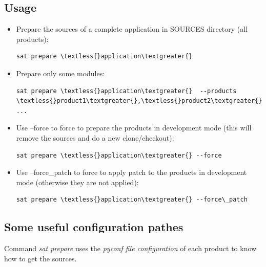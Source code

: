 \documentclass[a4paper,10pt,english]{sphinxmanual}
\begin{document}
\subsection{Usage}
\label{commands/prepare:usage}\begin{itemize}
\item {} 
Prepare the sources of a complete application in SOURCES directory (all products):

\begin{Verbatim}[commandchars=\\\{\}]
sat prepare \textless{}application\textgreater{}
\end{Verbatim}

\item {} 
Prepare only some modules:

\begin{Verbatim}[commandchars=\\\{\}]
sat prepare \textless{}application\textgreater{}  --products \textless{}product1\textgreater{},\textless{}product2\textgreater{} ...
\end{Verbatim}

\item {} 
Use --force to force to prepare the products in development mode
(this will remove the sources and do a new clone/checkout):

\begin{Verbatim}[commandchars=\\\{\}]
sat prepare \textless{}application\textgreater{} --force
\end{Verbatim}

\item {} 
Use --force\_patch to force to apply patch to the products
in development mode (otherwise they are not applied):

\begin{Verbatim}[commandchars=\\\{\}]
sat prepare \textless{}application\textgreater{} --force\_patch
\end{Verbatim}

\end{itemize}


\subsection{Some useful configuration pathes}
\label{commands/prepare:some-useful-configuration-pathes}
Command \emph{sat prepare} uses the \emph{pyconf file configuration} of each product to know how to get the sources.
\end{document}

